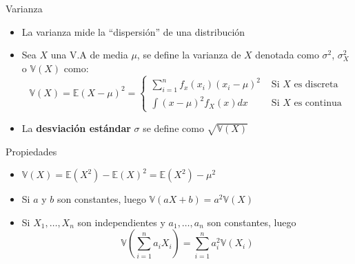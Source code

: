 \documentclass[handout]{beamer}
\begin{document}
\begin{frame}{Varianza}
\scriptsize{
\begin{itemize}
 \item La varianza mide la ``dispersión'' de una distribución
 \item Sea $X$ una V.A de media $\mu$, se define la varianza de $X$ denotada como $\sigma^2$, $\sigma^{2}_{X}$ o $\mathbb{V}(X)$ como:
  \begin{displaymath}
  \mathbb{V}(X) = \mathbb{E}(X - \mu)^2 =  \left\{ \begin{array}{rl}
  \sum_{i=1}^{n} f_{x}(x_{i})(x_{i} - \mu)^2 &\mbox{ Si $X$ es discreta} \\
   \int (x- \mu)^{2}f_X(x)dx &\mbox{ Si $X$ es continua}
       \end{array} \right.
  \end{displaymath}
\item La \textbf{desviación estándar} $\sigma$ se define como $\sqrt{\mathbb{V}(X)}$ 
\end{itemize}

\begin{block}{Propiedades}
\begin{itemize}
\item $\mathbb{V}(X)=  \mathbb{E}(X^2)- \mathbb{E}(X)^2 =  \mathbb{E}(X^2)-\mu^2 $ 
\item Si $a$ y $b$ son constantes, luego $\mathbb{V}(aX+b)=a^2\mathbb{V}(X)$
\item Si $X_1,\dots,X_n$ son independientes y $a_1,\dots,a_n$ son constantes, luego
\begin{displaymath}
 \mathbb{V}\left(\sum_{i=1}^{n}a_i X_i \right) = \sum_{i=1}^{n} a_{i}^{2} \mathbb{V}(X_{i})
\end{displaymath}


\end{itemize}

 
\end{block}


}
\end{frame}
\end{document}
